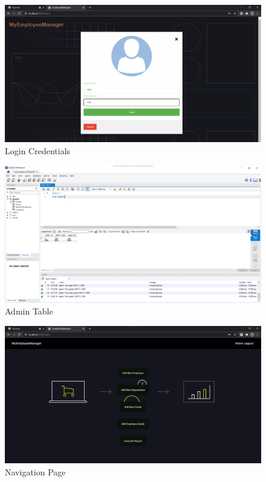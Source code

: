 \documentclass[12pt]{article}
\begin{document}
\begin{figure}[h!]
    \centering
    \includegraphics[width = \columnwidth]{screenshots/loginpage2.png}
    \caption{Login Credentials}
    \label{fig:my_label}
\end{figure}

\begin{figure}
    \centering
    \includegraphics[width = \columnwidth]{screenshots/loginsql.png}
    \caption{Admin Table}
    \label{fig:my_label}
\end{figure}

\begin{figure}
    \centering
    \includegraphics[width = \columnwidth]{screenshots/navigationpage.png}
    \caption{Navigation Page}
    \label{fig:my_label}
\end{figure}
\end{document}
